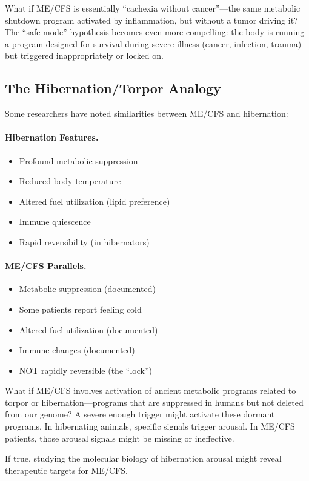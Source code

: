 \begin{open_question}
What if ME/CFS is essentially ``cachexia without cancer''---the same metabolic shutdown program activated by inflammation, but without a tumor driving it? The ``safe mode'' hypothesis becomes even more compelling: the body is running a program designed for survival during severe illness (cancer, infection, trauma) but triggered inappropriately or locked on.
\end{open_question}

\subsection{The Hibernation/Torpor Analogy}

Some researchers have noted similarities between ME/CFS and hibernation:

\paragraph{Hibernation Features.}
\begin{itemize}
    \item Profound metabolic suppression
    \item Reduced body temperature
    \item Altered fuel utilization (lipid preference)
    \item Immune quiescence
    \item Rapid reversibility (in hibernators)
\end{itemize}

\paragraph{ME/CFS Parallels.}
\begin{itemize}
    \item Metabolic suppression (documented)
    \item Some patients report feeling cold
    \item Altered fuel utilization (documented)
    \item Immune changes (documented)
    \item NOT rapidly reversible (the ``lock'')
\end{itemize}

\begin{open_question}
What if ME/CFS involves activation of ancient metabolic programs related to torpor or hibernation---programs that are suppressed in humans but not deleted from our genome? A severe enough trigger might activate these dormant programs. In hibernating animals, specific signals trigger arousal. In ME/CFS patients, those arousal signals might be missing or ineffective.

If true, studying the molecular biology of hibernation arousal might reveal therapeutic targets for ME/CFS.
\end{open_question}

